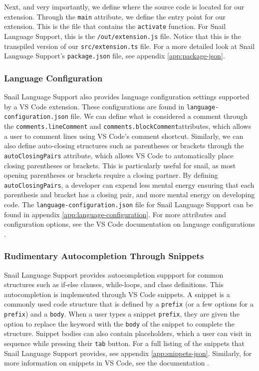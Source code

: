 \documentclass{article}
\begin{document}
Next, and very importantly, we define where the source code is located for our extension. Through the \lstinline{main} attribute, we define the entry point for our extension. This is the file that contains the \lstinline{activate} function. For Snail Language Support, this is the \lstinline{/out/extension.js} file. Notice that this is the transpiled version of our \lstinline{src/extension.ts} file. For a more detailed look at Snail Language Support's \lstinline{package.json} file, see appendix \ref{app:package-json}.

\subsubsection{Language Configuration}

Snail Language Support also provides language configuration settings supported by a VS Code extension. These configurations are found in \lstinline{language-configuration.json} file. We can define what is considered a comment through the \lstinline{comments.lineComment} and \lstinline{comments.blockComment}attributes, which allows a user to comment lines using VS Code's comment shortcut. Similarly, we can also define auto-closing structures such as parentheses or brackets through the \lstinline{autoClosingPairs} attribute, which allows VS Code to automatically place closing parentheses or brackets. This is particularly useful for snail, as most opening parentheses or brackets require a closing partner. By defining \lstinline{autoClosingPairs}, a developer can expend less mental energy ensuring that each parenthesis and bracket has a closing pair, and more mental energy on developing code. The \lstinline{language-configuration.json} file for Snail Language Support can be found in appendix \ref{app:language-configuration}. For more attributes and configuration options, see the VS Code documentation on language configurations \cite{Microsoft_2023f}.

\subsubsection{Rudimentary Autocompletion Through Snippets}

Snail Language Support provides autocompletion suppport for common structures such as if-else clauses, while-loops, and class definitions. This autocompletion is implemented through VS Code snippets. A snippet is a commonly used code structure that is defined by a \lstinline{prefix} (or a few options for a \lstinline{prefix}) and a \lstinline{body}. When a user types a snippet \lstinline{prefix}, they are given the option to replace the keyword with the \lstinline{body} of the snippet to complete the structure. Snippet bodies can also contain placeholders, which a user can visit in sequence while pressing their \lstinline{tab} button. For a full listing of the snippets that Snail Language Support provides, see appendix \ref{app:snippets-json}. Similarly, for more information on snippets in VS Code, see the documentation \cite{Microsoft_2023g}.
\end{document}

